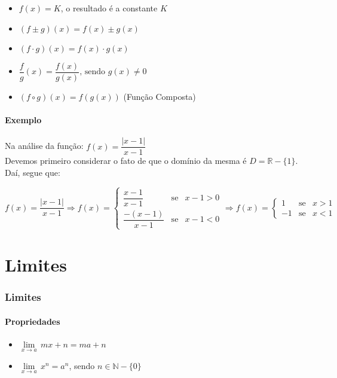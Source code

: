 \documentclass[12pt]{article}
\newcommand{\limit}[2]{\lim\limits_{x\rightarrow #1}\,#2}
\newcommand{\nl}{\hfill \newline}
\begin{document}
\begin{itemize}
\item $f(x) = K$, o resultado é a constante $K$
\item $(f\pm g)(x) = f(x) \pm g(x)$
\item $(f\cdot g)(x) = f(x) \cdot g(x)$
\item $\dfrac{f}{g}(x) = \dfrac{f(x)}{g(x)} \text{, sendo } g(x) \neq 0$
\item $(f \circ g)(x) = f( g(x) )$ (Função Composta)
\end{itemize}

\subsection{Exemplo}

Na análise da função: $f(x)=\dfrac{|x-1|}{x-1}$
\\[0.2cm]
Devemos primeiro considerar o fato de que o domínio da mesma é $D=\mathbb{R}-\{1\}$.
\nl
Daí, segue que:

$$
f(x)=\dfrac{|x-1|}{x-1}\Rightarrow 
f(x)=
\left\{
\begin{array}{lcl}
\dfrac{x-1}{x-1} & \text{se} & x-1 > 0\\[0.5cm]
\dfrac{-(x-1)}{x-1} & \text{se} & x-1 < 0
\end{array}
\right.
\Rightarrow
f(x)=
\left\{
\begin{array}{lcl}
1 & \text{se} & x >  1\\[0.5cm]
-1 & \text{se} & x < 1
\end{array}
\right.
$$

\newpage

\part{Limites}

\section{Limites}

\subsection{Propriedades}

\begin{itemize}
\item $\limit{a}{mx+n} = ma+n $
\item $\limit{a}{x^n} = a^n$, sendo $n \in \mathbb{N}-\{0\}$
\end{itemize}
\end{document}
